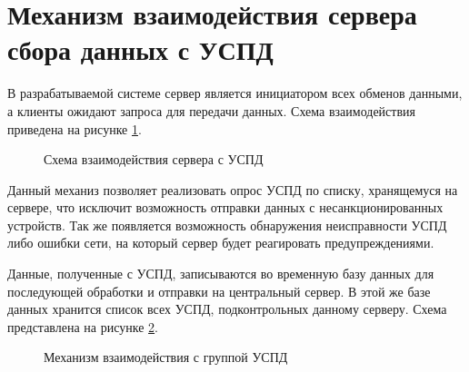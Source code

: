 \section{Механизм взаимодействия сервера сбора данных с УСПД}

В разрабатываемой системе сервер является инициатором всех обменов данными, а клиенты ожидают запроса для передачи данных. Схема взаимодействия приведена на рисунке \ref{scheme2:scheme2}.

\begin{figure}[h!]
 \caption{Схема взаимодействия сервера с УСПД}
 \label{scheme2:scheme2}
\end{figure}

Данный механиз позволяет реализовать опрос УСПД по списку, хранящемуся на сервере, что исключит возможность отправки данных с несанкционированных устройств. Так же появляется возможность обнаружения неисправности УСПД либо ошибки сети, на который сервер будет реагировать предупреждениями. 

Данные, полученные с УСПД, записываются во временную базу данных для последующей обработки и отправки на центральный сервер. В этой же базе данных хранится список всех УСПД, подконтрольных данному серверу. Схема представлена на рисунке \ref{scheme3:scheme3}.

\begin{figure}[h!]
 \caption{Механизм взаимодействия с группой УСПД}
 \label{scheme3:scheme3}
\end{figure}
